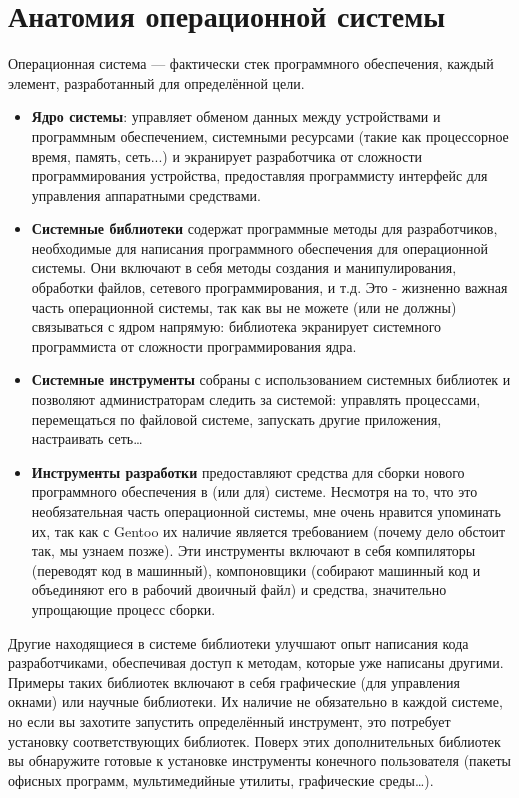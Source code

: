 \documentclass[10pt]{book}
\begin{document}
\newpage

\pagestyle{headings}
\chapter{Анатомия операционной системы}

Операционная система --- фактически стек программного обеспечения, каждый элемент, разработанный для определённой цели.

\begin{itemize}
	\item \textbf{Ядро системы}: управляет обменом данных между устройствами и программным обеспечением, системными ресурсами (такие как процессорное время, память, сеть...) и экранирует разработчика от сложности программирования устройства, предоставляя программисту интерфейс для управления аппаратными средствами.
	\item \textbf{Системные библиотеки} содержат программные методы для разработчиков, необходимые для написания программного обеспечения для операционной системы. Они включают в себя методы создания и манипулирования, обработки файлов, сетевого программирования, и т.д. Это - жизненно важная часть операционной системы, так как вы не можете (или не  должны) связываться с ядром напрямую: библиотека экранирует системного программиста от сложности программирования ядра.
	\item \textbf{Системные инструменты} собраны с использованием системных библиотек и позволяют администраторам следить за системой: управлять процессами, перемещаться по файловой системе, запускать другие приложения, настраивать сеть\ldots
	\item \textbf{Инструменты разработки} предоставляют средства для сборки нового программного обеспечения в (или для) системе. Несмотря на то, что это необязательная часть операционной системы, мне очень нравится упоминать их, так как с Gentoo их наличие является требованием (почему дело обстоит так, мы узнаем позже). Эти инструменты включают в себя компиляторы (переводят код в машинный), компоновщики (собирают машинный код и объединяют его в рабочий двоичный файл) и средства, значительно упрощающие процесс сборки.
\end{itemize}

Другие находящиеся в системе библиотеки улучшают опыт написания кода разработчиками, обеспечивая доступ к методам, которые уже написаны другими. Примеры таких библиотек включают в себя графические (для управления окнами) или научные библиотеки. Их наличие не обязательно в каждой системе, но если вы захотите запустить определённый инструмент, это потребует установку соответствующих библиотек. Поверх этих дополнительных библиотек вы обнаружите готовые к установке инструменты конечного пользователя (пакеты офисных программ, мультимедийные утилиты, графические среды\ldots).
\end{document}
